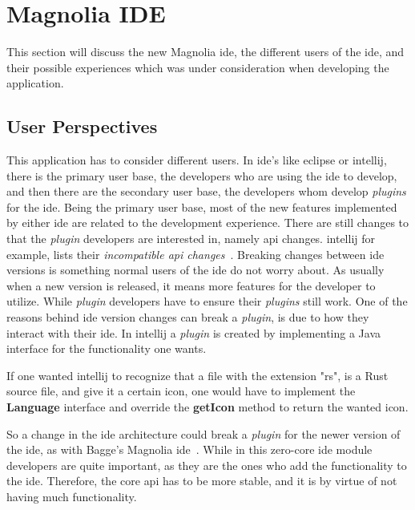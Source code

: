 \chapter{Magnolia IDE} \label{cha:ide}

This section will discuss the new Magnolia \gls*{ide}, the different users of the
\gls*{ide}, and their possible experiences which was under consideration when
developing the application.

\section{User Perspectives}

This application has to consider different users. In \gls*{ide}'s like
\gls*{eclipse} or \gls*{intellij}, there is the primary user base, the developers
who are using the \gls*{ide} to develop, and then there are the secondary user
base, the developers whom develop \textit{plugins} for the \gls*{ide}. Being the
primary user base, most of the new features implemented by either \gls*{ide} are
related to the development experience. There are still changes to that the
\textit{plugin} developers are interested in, namely \gls*{api} changes.
\gls*{intellij} for example, lists their \textit{incompatible \gls*{api} changes}~\cite{intellijBrokenApi}.
Breaking changes between \gls*{ide} versions is something normal users of the
\gls*{ide} do not worry about. As usually when a new version is released, it
means more features for the developer to utilize. While \textit{plugin}
developers have to ensure their \textit{plugins} still work. One of the reasons
behind \gls*{ide} version changes can break a \textit{plugin}, is due to how
they interact with their \gls*{ide}. In \gls*{intellij} a \textit{plugin} is
created by implementing a Java interface for the functionality one wants.

If one wanted \gls*{intellij} to recognize that a file with the extension "rs",
is a Rust source file, and give it a certain icon, one would have to implement
the \textbf{Language} interface and override the \textbf{getIcon} method to
return the wanted icon.

So a change in the \gls*{ide} architecture could break a \textit{plugin} for the
newer version of the \gls*{ide}, as with Bagge's Magnolia \gls*{ide}~\cite{baggeIde}.
While in this zero-core \gls*{ide} module developers are quite important, as they
are the ones who add the functionality to the \gls*{ide}. Therefore, the core
\gls*{api} has to be more stable, and it is by virtue of not having much
functionality.



